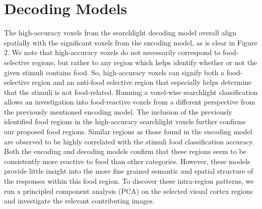 \documentclass[../thesis.tex]{subfiles}
\begin{document}
\section{Decoding Models}
The high-accuracy voxels from the searchlight decoding model overall align spatially with the significant voxels from the encoding model, as is clear in Figure 2. We note that high-accuracy voxels do not necessarily correspond to food-selective regions, but rather to any region which helps identify whether or not the given stimuli contains food. So, high-accuracy voxels can signify both a food-selective region and an anti-food selective region that especially helps determine that the stimuli is not food-related. 
Running a voxel-wise searchlight classification allows an investigation into food-reactive voxels from a different perspective from the previously mentioned encoding model. The inclusion of the previously identified food regions in the high-accuracy searchlight voxels further confirms our proposed food regions. Similar regions as those found in the encoding model are observed to be highly correlated with the stimuli food classification accuracy. \\

Both the encoding and decoding models confirm that these regions seem to be consistently more reactive to food than other categories. However, these models provide little insight into the more fine grained semantic and spatial structure of the responses within this food region. To discover these intra-region patterns, we run a principled component analysis (PCA) on the selected visual cortex regions and investigate the relevant contributing images. 
\end{document}
